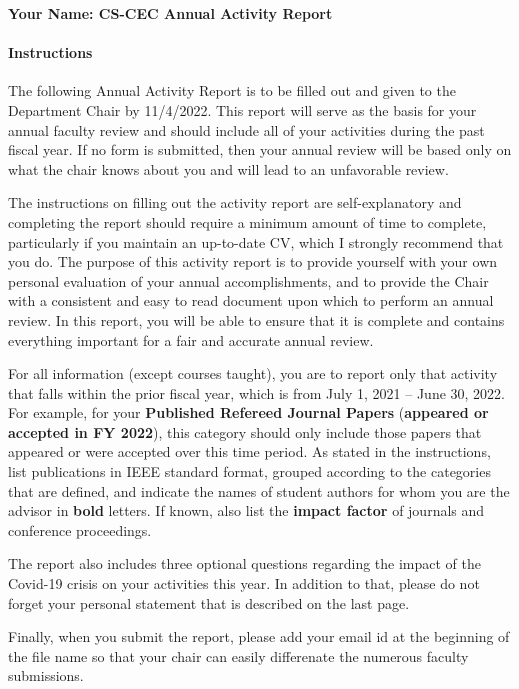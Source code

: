 \documentclass[11pt]{article}
\newcommand{\due}{11/4/2022}
\newcommand{\fy}{2022}
\newcommand{\fyperiod}{July 1, 2021 -- June 30, 2022}
\newcommand{\myname}{Your Name}
\begin{document}
\thispagestyle{empty}

\begin{center}
  \textbf{\Large {\myname}: CS-CEC Annual Activity Report}
\end{center}

\paragraph{Instructions} The following Annual Activity Report is to be filled out and given to
the Department Chair by \due{}. This report will serve as the
basis for your annual faculty review and should include all of your
activities during the past fiscal year. If no form is submitted, then
your annual review will be based only on what the chair knows about you
and will lead to an unfavorable review.

The instructions on filling out the activity report are self-explanatory
and completing the report should require a minimum amount of time to
complete, particularly if you maintain an up-to-date CV, which I
strongly recommend that you do. The purpose of this activity report is
to provide yourself with your own personal evaluation of your annual
accomplishments, and to provide the Chair with a consistent and easy to
read document upon which to perform an annual review. In this report,
you will be able to ensure that it is complete and contains everything
important for a fair and accurate annual review.

For all information (except courses taught), you are to report only that
activity that falls within the prior fiscal year, which is from \fyperiod{}. For example, for your \textbf{Published Refereed
Journal Papers} (\textbf{appeared or accepted in FY \fy{}}), this
category should only include those papers that appeared or were accepted
over this time period. As stated in the instructions, list publications
in IEEE standard format, grouped according to the categories that are
defined, and indicate the names of student authors for whom you are the
advisor in \textbf{bold} letters. If known, also list the \textbf{impact
factor} of journals and conference proceedings.

The report also includes three optional questions regarding the impact
of the Covid-19 crisis on your activities this year. In addition to
that, please do not forget your personal statement that is described on
the last page.

Finally, when you submit the report, please add your email id at the
beginning of the file name so that your chair can easily differenate the
numerous faculty submissions.
\end{document}
